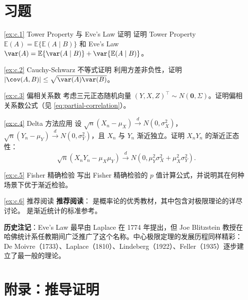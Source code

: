 \section{习题}

\begin{Exercise}{\ref{ex:c.1} Tower Property 与 Eve's Law 证明}\label{ex:c.1}
证明 Tower Property $\mathbb{E}(A) = \mathbb{E}\{\mathbb{E}(A \mid B)\}$ 和 Eve's Law $\var(A) = \mathbb{E}\{\var(A \mid B)\} + \var\{\mathbb{E}(A \mid B)\}$。
\end{Exercise}

\begin{Exercise}{\ref{ex:c.2} Cauchy-Schwarz 不等式证明}\label{ex:c.2}
利用方差非负性，证明 $|\cov(A, B)| \leq \sqrt{\var(A)\var(B)}$。
\end{Exercise}

\begin{Exercise}{\ref{ex:c.3} 偏相关系数}\label{ex:c.3}
考虑三元正态随机向量 $(Y, X, Z)^\top \sim N(\mathbf{0}, \Sigma)$。证明偏相关系数公式（见 \cref{eq:partial-correlation}）。
\end{Exercise}

\begin{Exercise}{\ref{ex:c.4} Delta 方法应用}\label{ex:c.4}
设 $\sqrt{n}(X_n - \mu_X) \xrightarrow{d} N(0, \sigma_X^2)$，$\sqrt{n}(Y_n - \mu_Y) \xrightarrow{d} N(0, \sigma_Y^2)$，且 $X_n$ 与 $Y_n$ 渐近独立。证明 $X_n Y_n$ 的渐近正态性：
\[
\sqrt{n}(X_n Y_n - \mu_X \mu_Y) \xrightarrow{d} N(0, \mu_Y^2\sigma_X^2 + \mu_X^2\sigma_Y^2) .
\]
\end{Exercise}

\begin{Exercise}{\ref{ex:c.5} Fisher 精确检验}\label{ex:c.5}
写出 Fisher 精确检验的 $p$ 值计算公式，并说明其在何种场景下优于渐近检验。
\end{Exercise}

\begin{Exercise}{\ref{ex:c.6} 推荐阅读}\label{ex:c.6}
\begingroup
\parskip=0pt
\textbf{推荐阅读}：\cite{durrett2019} 是概率论的优秀教材，其中包含对极限理论的详尽讨论。\cite{van2000} 是渐近统计的标准参考。

\textbf{历史注记}：Eve's Law 最早由 Laplace 在 1774 年提出，但 Joe Blitzstein 教授在哈佛统计系任教期间广泛推广了这个名称。中心极限定理的发展历程同样精彩：De Moivre（1733）、Laplace（1810）、Lindeberg（1922）、Feller（1935）逐步建立了最一般的理论。
\endgroup
\end{Exercise}

\section{附录：推导证明}\label{sec:appendixC-derivations}

